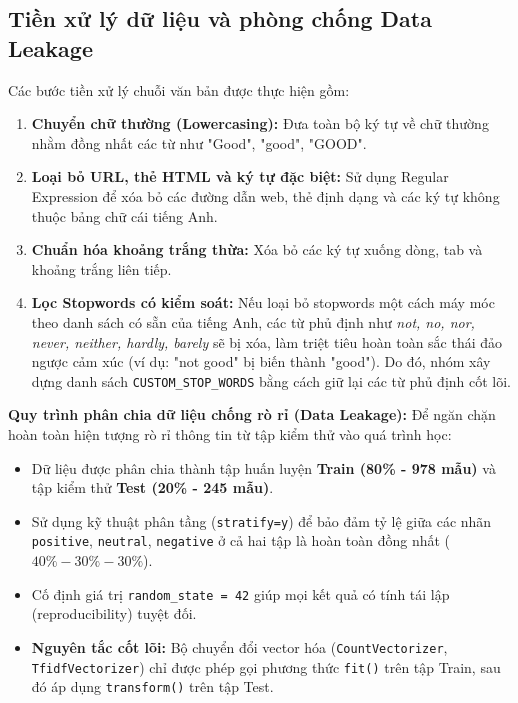 \documentclass[12pt,a4paper]{article}
\begin{document}
\subsection{Tiền xử lý dữ liệu và phòng chống Data Leakage}
Các bước tiền xử lý chuỗi văn bản được thực hiện gồm:
\begin{enumerate}
    \item \textbf{Chuyển chữ thường (Lowercasing):} Đưa toàn bộ ký tự về chữ thường nhằm đồng nhất các từ như "Good", "good", "GOOD".
    \item \textbf{Loại bỏ URL, thẻ HTML và ký tự đặc biệt:} Sử dụng Regular Expression để xóa bỏ các đường dẫn web, thẻ định dạng và các ký tự không thuộc bảng chữ cái tiếng Anh.
    \item \textbf{Chuẩn hóa khoảng trắng thừa:} Xóa bỏ các ký tự xuống dòng, tab và khoảng trắng liên tiếp.
    \item \textbf{Lọc Stopwords có kiểm soát:} Nếu loại bỏ stopwords một cách máy móc theo danh sách có sẵn của tiếng Anh, các từ phủ định như \textit{not, no, nor, never, neither, hardly, barely} sẽ bị xóa, làm triệt tiêu hoàn toàn sắc thái đảo ngược cảm xúc (ví dụ: "not good" bị biến thành "good"). Do đó, nhóm xây dựng danh sách \texttt{CUSTOM\_STOP\_WORDS} bằng cách giữ lại các từ phủ định cốt lõi.
\end{enumerate}

\textbf{Quy trình phân chia dữ liệu chống rò rỉ (Data Leakage):}
Để ngăn chặn hoàn toàn hiện tượng rò rỉ thông tin từ tập kiểm thử vào quá trình học:
\begin{itemize}
    \item Dữ liệu được phân chia thành tập huấn luyện \textbf{Train (80\% - 978 mẫu)} và tập kiểm thử \textbf{Test (20\% - 245 mẫu)}.
    \item Sử dụng kỹ thuật phân tầng (\texttt{stratify=y}) để bảo đảm tỷ lệ giữa các nhãn \texttt{positive}, \texttt{neutral}, \texttt{negative} ở cả hai tập là hoàn toàn đồng nhất ($40\% - 30\% - 30\%$).
    \item Cố định giá trị \texttt{random\_state = 42} giúp mọi kết quả có tính tái lập (reproducibility) tuyệt đối.
    \item \textbf{Nguyên tắc cốt lõi:} Bộ chuyển đổi vector hóa (\texttt{CountVectorizer}, \texttt{TfidfVectorizer}) chỉ được phép gọi phương thức \texttt{fit()} trên tập Train, sau đó áp dụng \texttt{transform()} trên tập Test.
\end{itemize}
\end{document}
